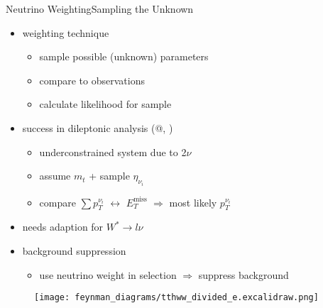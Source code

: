 \documentclass[9pt, aspectratio=169]{beamer}
\begin{document}
\begin{frame}{Neutrino Weighting}{Sampling the Unknown}
	\begin{minipage}{.58\textwidth}
		\begin{itemize}
			\item weighting technique
			\begin{itemize}
				\item sample possible (unknown) parameters
				\item compare to observations
				\item calculate likelihood for sample
			\end{itemize}
			\item success in dileptonic \ttbar analysis (@\atlas, \dzero)
			\begin{itemize}
				\item underconstrained system due to 2$\nu$
				\item assume $m_t$ + sample $\eta_{\nu_i}$ 
				\item compare $\sum p_T^{\nu_i}$ $\leftrightarrow$ $E_T^\text{miss}$ $\Rightarrow$ most likely $p_T^{\nu_i}$  
			\end{itemize}
			\item needs adaption for $W^*\rightarrow l\nu$  
			\item background suppression
			\begin{itemize}
				\item use neutrino weight in selection $\Rightarrow$ suppress background
			\end{itemize} 
		\end{itemize}
	\end{minipage}\hfill
	\begin{minipage}{.4\textwidth}
		\begin{figure}
			\centering
			\texttt{[image: feynman\_diagrams/tthww\_divided\_e.excalidraw.png]}	
		\end{figure}
	\end{minipage}
\end{frame}
\end{document}
